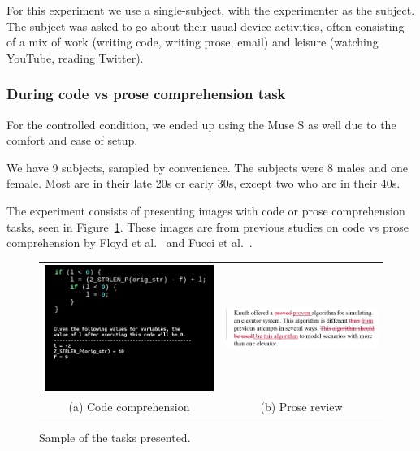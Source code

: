             For this experiment we use a single-subject, with the experimenter as the subject. The subject was asked to go about their usual device activities, often consisting of a mix of work (writing code, writing prose, email) and leisure (watching YouTube, reading Twitter).

        \subsubsection*{During code vs prose comprehension task}

            For the controlled condition, we ended up using the Muse S as well due to the comfort and ease of setup.

            We have 9 subjects, sampled by convenience. The subjects were 8 males and one female. Most are in their late 20s or early 30s, except two who are in their 40s.

            The experiment consists of presenting images with code or prose comprehension tasks, seen in Figure~\ref{fig:tasks}. These images are from previous studies on code vs prose comprehension by Floyd et al.~\cite{floyd_decoding_2017} and Fucci et al.~\cite{fucci_replication_2019}. 


            \begin{figure}[H]
                \centering
                \begin{tabular}{cc}
                    \includegraphics[trim=25 160 0 0,clip,width=75mm]{img/final-1-1.png}
                    &
                    \includegraphics[trim=20 0 20 0,clip,width=75mm]{img/bugs_1.PNG}
                    \\
                    (a) Code comprehension
                    &
                    (b) Prose review
                \end{tabular}
                \caption{Sample of the tasks presented.}\label{fig:tasks}
            \end{figure}


